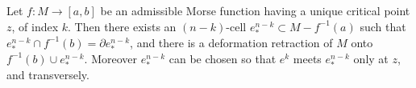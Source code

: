 Let $f: M \to [a, b]$ be an admissible Morse function having a unique critical point $z$, of index $k$. Then there exists an $(n-k)$-cell $e_*^{n-k} \subset M - f^{-1}(a)$ such that $e_*^{n-k} \cap f^{-1}(b) = \partial e_*^{n-k}$, and there is a deformation retraction of $M$ onto $f^{-1}(b) \cup e_*^{n-k}$. Moreover $e_*^{n-k}$ can be chosen so that $e^k$ meets $e_*^{n-k}$ only at $z$, and transversely.
